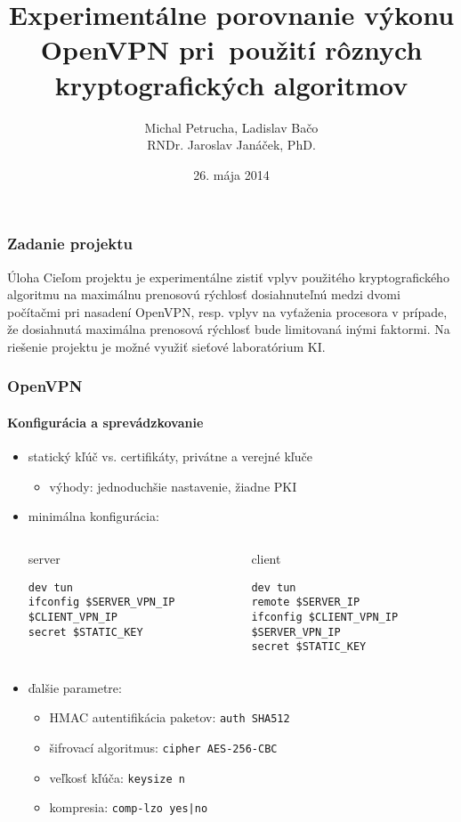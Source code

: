 \documentclass{beamer}
\title{Experimentálne porovnanie výkonu OpenVPN pri~použití rôznych kryptografických algoritmov}
\author[Petrucha, Bačo]{Michal Petrucha, Ladislav Bačo\\{\tiny RNDr. Jaroslav Janáček, PhD.}}
\institute{
Fakulta matematiky, fyziky a informatiky\\
Univerzita Komenského, Bratislava
}
\date{26. mája 2014}
\begin{document}
\frame{\titlepage}

\begin{frame}
	\frametitle{Zadanie projektu}
	\begin{block}{Úloha}
	\justifying
	Cieľom projektu je experimentálne zistiť vplyv použitého kryptografického algoritmu na maximálnu prenosovú rýchlosť dosiahnuteľnú medzi dvomi počítačmi pri nasadení OpenVPN, resp. vplyv na vyťaženia procesora v prípade, že dosiahnutá maximálna prenosová rýchlosť bude limitovaná inými faktormi. Na riešenie projektu je možné využiť sieťové laboratórium KI.
	\end{block}
\end{frame}

\begin{frame}[fragile]
	\frametitle{OpenVPN}
	\framesubtitle{Konfigurácia a sprevádzkovanie}
	\begin{itemize}
		\item statický kľúč vs. certifikáty, privátne a verejné kľuče
			\begin{itemize}
				\item výhody: jednoduchšie nastavenie, žiadne PKI
			\end{itemize}
		\item minimálna konfigurácia:
			\begin{columns}
				\tiny
					\begin{block}{server}
\begin{verbatim}
dev tun
ifconfig $SERVER_VPN_IP $CLIENT_VPN_IP
secret $STATIC_KEY
\end{verbatim}
					\end{block}
					\begin{block}{client}
\begin{verbatim}
dev tun
remote $SERVER_IP
ifconfig $CLIENT_VPN_IP $SERVER_VPN_IP
secret $STATIC_KEY
\end{verbatim}
					\end{block}
			\end{columns}

		\item ďalšie parametre:
			\begin{itemize}
				\item HMAC autentifikácia paketov: \texttt{auth SHA512}
				\item šifrovací algoritmus: \texttt{cipher AES-256-CBC}
				\item veľkosť kľúča: \texttt{keysize n}
				\item kompresia: \texttt{comp-lzo yes|no}
			\end{itemize}
	\end{itemize}
\end{frame}
\end{document}
